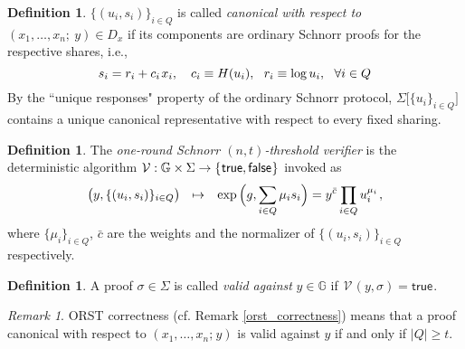 \documentclass[psamsfonts, reqno]{amsart}
\theoremstyle{definition}
\newtheorem{defn}[thm]{Definition}
\theoremstyle{remark}
\newtheorem{rem}[thm]{Remark}
\numberwithin{equation}{section}
\begin{document}
\begin{defn}\label{orst_canonical_def}
$\{(u_i, s_i)\}_{i \in Q}$ is called
\textit{canonical with respect to} %
$(x_1, \dots, x_n;\ y) \in D_x$
if its components are ordinary Schnorr proofs
for the respective shares, i.e.,
\vspace{5pt}
\begin{equation}\label{orst_canonical}
s_i = r_i + c_i \hspace{1pt} x_i,
\ \ \ c_i \equiv H(u_i),
\ \ r_i \equiv \log u_i,
\ \ \forall i \in Q
\vspace{5pt}
\end{equation}
By the ``unique responses" property
of the ordinary Schnorr protocol,
$\Sigma\big[\{u_i\}_{i \in Q}\big]$
contains a unique canonical representative
with respect to every fixed sharing.
\end{defn}

\begin{defn}\label{orst_verifier}
The \textit{one-round Schnorr $(n, t)$-threshold verifier}
is the deterministic algorithm
$\mathcal{V}: \mathbb{G} \times \Sigma \rightarrow
\{\hspace{0.5pt}\textsf{true}, \textsf{false}\hspace{0.5pt}\}$
invoked as
\vspace{5pt}
\begin{equation*}
\big(y, \{(u_i, s_i)\}_{i \in Q}\big)\
\ \mapsto
\ \hspace{4pt}\exp\Big(g, {\sum_{i \in Q} \mu_i s_i}\Big) =
y ^ {\bar{c}} \prod_{i \in Q} u_i^{\mu_i}
\hspace{1pt},
\vspace{5pt}
\end{equation*}
where $\{\mu_i\}_{i \in Q}$, $\bar{c}$ are
the weights and the normalizer of $\{(u_i, s_i)\}_{i \in Q}$
respectively.
\end{defn}

\begin{defn}\label{orst_validity_definition}
A proof $\sigma \in \Sigma$ is called
\textit{valid against} $y \in \mathbb{G}$ if
$\hspace{1pt}\mathcal{V}\hspace{1pt}(y, \sigma)
= \textsf{true}\hspace{1pt}$.
\end{defn}

\begin{rem}
\textsf{ORST} correctness
(cf. Remark \ref{orst_correctness})
means that a proof canonical with respect
to $(x_1, \dots, x_n;\hspace{1pt} y)$
is valid against $y$ if and only if $|Q| \ge t$.
\end{rem}
\end{document}
